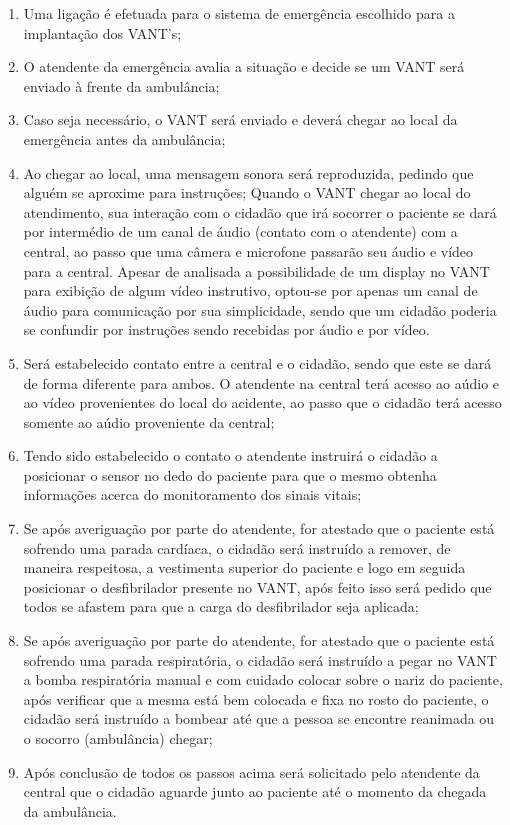 \begin{enumerate}
  \item Uma ligação é efetuada para o sistema de emergência escolhido para a implantação dos VANT’s;
  \item O atendente da emergência avalia a situação e decide se um VANT será enviado à frente da ambulância;
  \item Caso seja necessário, o VANT será enviado e deverá chegar ao local da emergência antes da ambulância;
  \item Ao chegar ao local, uma mensagem sonora será reproduzida, pedindo que alguém se aproxime para instruções;
  Quando o VANT chegar ao local do atendimento, sua interação com o cidadão que irá socorrer o paciente se dará por intermédio de um canal de áudio (contato com o atendente) com a central, ao passo que uma câmera e microfone passarão seu áudio e vídeo para a central. 
  Apesar de analisada a possibilidade de um display no VANT para exibição de algum vídeo instrutivo, optou-se por apenas um canal de áudio para comunicação por sua simplicidade, sendo que um cidadão poderia se confundir por instruções sendo recebidas por áudio e por vídeo.
  \item Será estabelecido contato entre a central e o cidadão, sendo que este se dará de forma diferente para ambos. O atendente na central terá acesso ao aúdio e ao vídeo provenientes do local do acidente, ao passo que o cidadão terá acesso somente ao aúdio proveniente da central;
  \item Tendo sido estabelecido o contato o atendente instruirá o cidadão a posicionar o sensor no dedo do paciente para que o mesmo obtenha informações acerca do monitoramento dos sinais vitais;
  \item Se após averiguação por parte do atendente, for atestado que o paciente está sofrendo uma parada cardíaca, o cidadão será instruído a remover, de maneira respeitosa, a vestimenta superior do paciente e logo em seguida posicionar o desfibrilador presente no VANT, após feito isso será pedido que todos se afastem para que a carga do desfibrilador seja aplicada;
  \item Se após averiguação por parte do atendente, for atestado que o paciente está sofrendo uma parada respiratória, o cidadão será instruído a pegar no VANT a bomba respiratória manual e com cuidado colocar sobre o nariz do paciente, após verificar que a mesma está bem colocada e fixa no rosto do paciente, o cidadão será instruído a bombear até que a pessoa se encontre reanimada ou o socorro (ambulância) chegar;
  \item Após conclusão de todos os passos acima será solicitado pelo atendente da central que o cidadão aguarde junto ao paciente até o momento da chegada da ambulância.

\end{enumerate}
